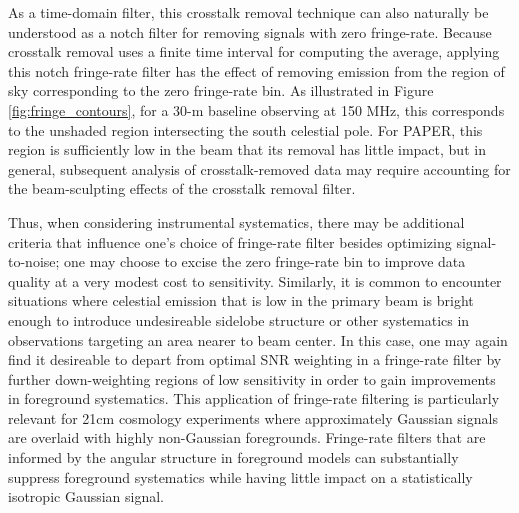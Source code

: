 \documentclass[twocolumn,apj,numberedappendix]{emulateapj}
\begin{document}
As a time-domain filter, this crosstalk removal technique can also naturally be understood as a notch filter
for removing signals with zero fringe-rate.  Because crosstalk removal uses a finite time interval for computing
the average, applying this notch fringe-rate filter has the effect of removing emission from the region of
sky corresponding to the zero fringe-rate bin.  As illustrated in Figure \ref{fig:fringe_contours}, for
a 30-m baseline observing at 150 MHz, this corresponds to the unshaded region intersecting the south celestial pole.
For PAPER, this region is sufficiently low in the beam that its removal has little impact, but in general, 
subsequent analysis of crosstalk-removed data may require accounting for the beam-sculpting effects of
the crosstalk removal filter.

Thus, when considering instrumental systematics, there may be additional criteria that influence one's
choice of fringe-rate filter besides optimizing signal-to-noise; one may choose to excise the zero fringe-rate
bin to improve data quality at a very modest cost to sensitivity.  Similarly, it is common to encounter situations
where celestial emission that is low in the primary beam is bright enough to introduce undesireable 
sidelobe structure or other systematics in observations targeting an area nearer to beam center.  In this case,
one may again find it desireable to depart from optimal SNR weighting in a fringe-rate filter
by further down-weighting regions of low sensitivity in order to gain improvements in foreground systematics.
This application of fringe-rate filtering is particularly relevant for 21cm cosmology experiments where approximately
Gaussian signals are overlaid with highly non-Gaussian foregrounds.  Fringe-rate filters that are informed by 
the angular structure in foreground models can substantially suppress foreground systematics while having little
impact on a statistically isotropic Gaussian signal.


\end{document}
